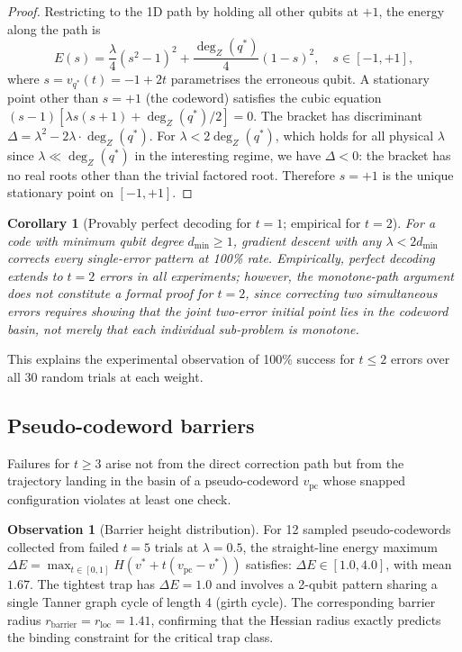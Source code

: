 \documentclass[12pt,a4paper]{article}
\theoremstyle{plain}
\newtheorem{corollary}[theorem]{Corollary}
\theoremstyle{definition}
\newtheorem{observation}[theorem]{Observation}
\theoremstyle{remark}
\newcommand{\dZ}{\operatorname{deg}_Z}
\begin{document}
\begin{proof}
Restricting to the 1D path by holding all other qubits at $+1$, the
energy along the path is
\[
  E(s) = \frac{\lambda}{4}(s^2-1)^2 + \frac{\dZ(q^*)}{4}(1-s)^2,
  \quad s \in [-1, +1],
\]
where $s = v_{q^*}(t) = -1 + 2t$ parametrises the erroneous qubit.
A stationary point other than $s=+1$ (the codeword) satisfies the
cubic equation $(s-1)[\lambda s(s+1) + \dZ(q^*)/2] = 0$.
The bracket has discriminant $\Delta = \lambda^2 - 2\lambda\cdot\dZ(q^*)$.
For $\lambda < 2\dZ(q^*)$, which holds for all physical $\lambda$ since
$\lambda \ll \dZ(q^*)$ in the interesting regime, we have $\Delta < 0$:
the bracket has no real roots other than the trivial factored root.
Therefore $s=+1$ is the unique stationary point on $[-1,+1]$.
\end{proof}

\begin{corollary}[Provably perfect decoding for $t=1$; empirical for $t=2$]\label{cor:perfect}
For a code with minimum qubit degree $d_{\min} \geq 1$, gradient descent
with any $\lambda < 2d_{\min}$ corrects every single-error pattern at
100\% rate.
Empirically, perfect decoding extends to $t=2$ errors in all experiments;
however, the monotone-path argument does not constitute a formal proof
for $t=2$, since correcting two simultaneous errors requires showing that
the joint two-error initial point lies in the codeword basin, not merely
that each individual sub-problem is monotone.
\end{corollary}

This explains the experimental observation of 100\% success for $t\leq 2$
errors over all 30 random trials at each weight.

\subsection{Pseudo-codeword barriers}

Failures for $t\geq 3$ arise not from the direct correction path but from
the trajectory landing in the basin of a pseudo-codeword $v_{\mathrm{pc}}$
whose snapped configuration violates at least one check.

\begin{observation}[Barrier height distribution]\label{obs:barriers}
For 12 sampled pseudo-codewords collected from failed $t=5$ trials at
$\lambda=0.5$, the straight-line energy maximum $\Delta E = \max_{t\in[0,1]}
H(v^* + t(v_{\mathrm{pc}} - v^*))$ satisfies:
$\Delta E \in [1.0, 4.0]$, with mean $1.67$.
The tightest trap has $\Delta E = 1.0$ and involves a 2-qubit pattern
sharing a single Tanner graph cycle of length 4 (girth cycle).
The corresponding barrier radius $r_{\mathrm{barrier}} = r_{\mathrm{loc}} = 1.41$,
confirming that the Hessian radius exactly predicts the binding constraint
for the critical trap class.
\end{observation}
\end{document}
